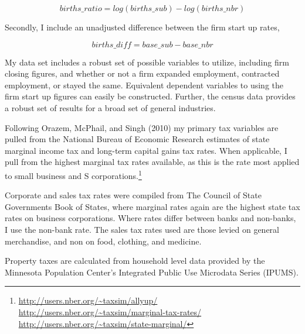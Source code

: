 \documentclass[11pt,a4paper]{article}\usepackage[]{graphicx}\usepackage[]{color}
\begin{document}
$$ births\_ratio = log(births\_{sub}) - log(births\_{nbr})$$

Secondly, I include an unadjusted difference between the firm start up rates,

$$ births\_diff = base\_{sub} - base\_{nbr}$$

My data set includes a robust set of possible variables to utilize, including firm closing figures, and whether or not a firm expanded employment, contracted employment, or stayed the same. Equivalent dependent variables to using the firm start up figures can easily be constructed. Further, the census data provides a robust set of results for a broad set of general industries.

Following Orazem, McPhail, and Singh (2010) my primary tax variables are pulled from the National Bureau of Economic Research estimates of state marginal income tax and long-term capital gains tax rates. When applicable, I pull from the highest marginal tax rates available, as this is the rate most applied to small business and S corporations.\footnote{\url{http://users.nber.org/~taxsim/allyup/} \url{http://users.nber.org/~taxsim/marginal-tax-rates/} \url{http://users.nber.org/~taxsim/state-marginal/}}

Corporate and sales tax rates were compiled from The Council of State Governments Book of States, where marginal rates again are the highest state tax rates on business corporations. Where rates differ between banks and non-banks, I use the non-bank rate. The sales tax rates used are those levied on general merchandise, and non on food, clothing, and medicine.

Property taxes are calculated from household level data provided by the Minnesota Population Center's Integrated Public Use Microdata Series (IPUMS).
\end{document}
